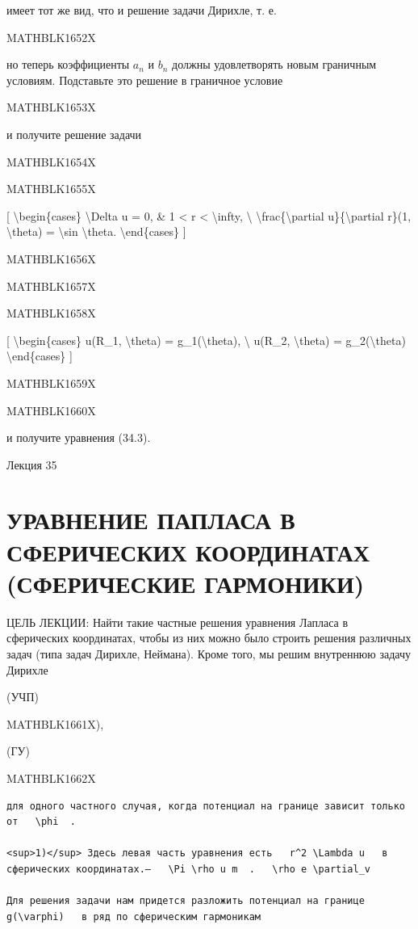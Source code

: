 \documentclass[
]{article}
\begin{document}
имеет тот же вид, что и решение задачи Дирихле, т. е.

MATHBLK1652X

но теперь коэффициенты \(a_n\) и \(b_n\) должны удовлетворять новым
граничным условиям. Подставьте это решение в граничное условие

MATHBLK1653X

и получите решение задачи

MATHBLK1654X

MATHBLK1655X

{[} \textbackslash begin\{cases\} \textbackslash Delta u = 0, \& 1
\textless{} r \textless{} \textbackslash infty, \textbackslash{}
\textbackslash frac\{\textbackslash partial u\}\{\textbackslash partial
r\}(1, \textbackslash theta) = \textbackslash sin \textbackslash theta.
\textbackslash end\{cases\} {]}

MATHBLK1656X

MATHBLK1657X

MATHBLK1658X

{[} \textbackslash begin\{cases\} u(R\_1, \textbackslash theta) =
g\_1(\textbackslash theta), \textbackslash{} u(R\_2,
\textbackslash theta) = g\_2(\textbackslash theta)
\textbackslash end\{cases\} {]}

MATHBLK1659X

MATHBLK1660X

и получите уравнения (34.3).

Лекция 35

\section{УРАВНЕНИЕ ПАПЛАСА В СФЕРИЧЕСКИХ КООРДИНАТАХ (СФЕРИЧЕСКИЕ
ГАРМОНИКИ)}\label{ux443ux440ux430ux432ux43dux435ux43dux438ux435-ux43fux430ux43fux43bux430ux441ux430-ux432-ux441ux444ux435ux440ux438ux447ux435ux441ux43aux438ux445-ux43aux43eux43eux440ux434ux438ux43dux430ux442ux430ux445-ux441ux444ux435ux440ux438ux447ux435ux441ux43aux438ux435-ux433ux430ux440ux43cux43eux43dux438ux43aux438}

ЦЕЛЬ ЛЕКЦИИ: Найти такие частные решения уравнения Лапласа в сферических
координатах, чтобы из них можно было строить решения различных задач
(типа задач Дирихле, Неймана). Кроме того, мы решим внутреннюю задачу
Дирихле

(УЧП)

MATHBLK1661X),

(ГУ)

MATHBLK1662X

\begin{verbatim}
для одного частного случая, когда потенциал на границе зависит только от   \phi  .

<sup>1)</sup> Здесь левая часть уравнения есть   r^2 \Lambda u   в сферических координатах.—   \Pi \rho u m  .   \rho e \partial_v

Для решения задачи нам придется разложить потенциал на границе   g(\varphi)   в ряд по сферическим гармоникам
\end{verbatim}
\end{document}
